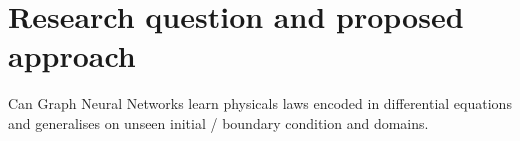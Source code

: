 
\section{Research question and proposed approach}
Can Graph Neural Networks learn physicals laws encoded in differential equations and generalises on unseen initial / boundary condition  and domains.
\label{sec:approach}

